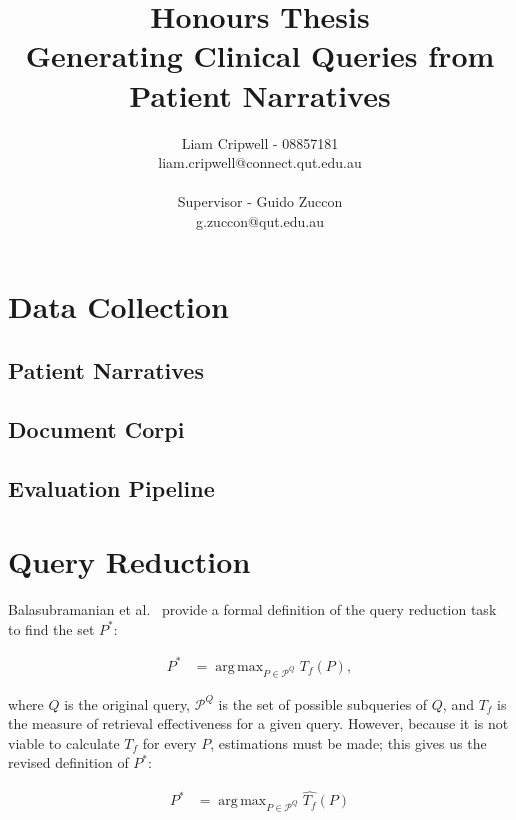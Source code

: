 \documentclass[a4paper]{article}
\DeclareMathOperator*{\argmax}{arg\,max}
\begin{document}
\title{\small Honours Thesis\\\huge Generating Clinical Queries from Patient Narratives}

\author{Liam Cripwell - 08857181\\liam.cripwell@connect.qut.edu.au\\\\\small Supervisor - Guido Zuccon\\\small g.zuccon@qut.edu.au\\}
\maketitle
\pagebreak
\tableofcontents
\pagebreak

\section{Data Collection}
\subsection{Patient Narratives}
\subsection{Document Corpi}
\subsection{Evaluation Pipeline}

\section{Query Reduction}
Balasubramanian et al.~\citep{Balasubramanian:2010:ERL:1835449.1835545} provide a formal definition of the query reduction task to find the set $P^*$:

\begin{equation}
\begin{split}
P^* &= \argmax_{P\in \mathcal{P}^Q} T_f(P),
\end{split}
\end{equation}

where $Q$ is the original query, $\mathcal{P}^Q$ is the set of possible subqueries of $Q$, and $T_f$ is the measure of retrieval effectiveness for a given query. However, because it is not viable to calculate $T_f$ for every $P$, estimations must be made; this gives us the revised definition of $P^*$:

\begin{equation}
\label{QRdefinition}
\begin{split}
P^* &= \argmax_{P\in \mathcal{P}^Q} \widehat{T_f}(P)
\end{split}
\end{equation}
\end{document}
